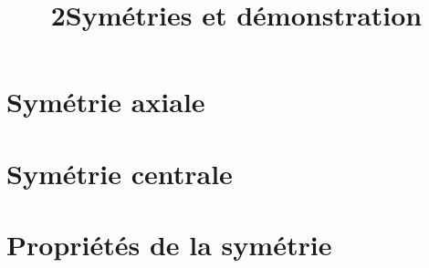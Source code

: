 \documentclass[12pt,a4paper]{article}
\date{}
\title{\textcircled{{\normalsize{2}}}Symétries et démonstration}
\begin{document}
\maketitle








\section{Symétrie axiale}




\newpage

\section{Symétrie centrale}





\section{Propriétés de la symétrie}




%
%
\end{document}
